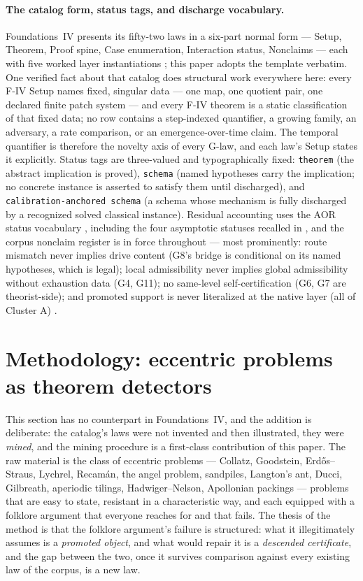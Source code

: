 \documentclass[11pt]{article}
\newcommand{\FoundIV}{Foundations~IV}
\theoremstyle{definition}
\begin{document}
\paragraph{The catalog form, status tags, and discharge vocabulary.} \FoundIV{} presents its
fifty-two laws in a six-part normal form --- Setup, Theorem, Proof spine, Case enumeration,
Interaction status, Nonclaims --- each with five worked layer instantiations
\citep{Tsiokos2026FoundIV}; this paper adopts the template verbatim. One verified fact about that
catalog does structural work everywhere here: every F-IV Setup names fixed, singular data --- one
map, one quotient pair, one declared finite patch system --- and every F-IV theorem is a static
classification of that fixed data; no row contains a step-indexed quantifier, a growing family, an
adversary, a rate comparison, or an emergence-over-time claim. The temporal quantifier is therefore
the novelty axis of every G-law, and each law's Setup states it explicitly. Status tags are
three-valued and typographically fixed: \texttt{theorem} (the abstract implication is proved),
\texttt{schema} (named hypotheses carry the implication; no concrete instance is asserted to satisfy
them until discharged), and \texttt{calibration-anchored schema} (a schema whose mechanism is fully
discharged by a recognized solved classical instance). Residual accounting uses the AOR status
vocabulary \citep{Tsiokos2026AOR}, including the four asymptotic statuses recalled in
, and the corpus nonclaim register is in force throughout --- most
prominently: route mismatch never implies drive content (G8's bridge is conditional on its named
hypotheses, which is legal); local admissibility never implies global admissibility without
exhaustion data (G4, G11); no same-level self-certification (G6, G7 are theorist-side); and promoted
support is never literalized at the native layer (all of Cluster A)
\citep{Tsiokos2026FoundIII}.

 \section{Methodology: eccentric problems as theorem detectors}\label{sec:methodology}

This section has no counterpart in \FoundIV{}, and the addition is deliberate: the catalog's laws were
not invented and then illustrated, they were \emph{mined}, and the mining procedure is a first-class
contribution of this paper. The raw material is the class of eccentric problems --- Collatz,
Goodstein, Erd\H{o}s--Straus, Lychrel, Recam\'an, the angel problem, sandpiles, Langton's ant, Ducci,
Gilbreath, aperiodic tilings, Hadwiger--Nelson, Apollonian packings --- problems that are easy to
state, resistant in a characteristic way, and each equipped with a folklore argument that everyone
reaches for and that fails. The thesis of the method is that the folklore argument's failure is
structured: what it illegitimately assumes is a \emph{promoted object}, and what would repair it is a
\emph{descended certificate}, and the gap between the two, once it survives comparison against every
existing law of the corpus, is a new law.
\end{document}

